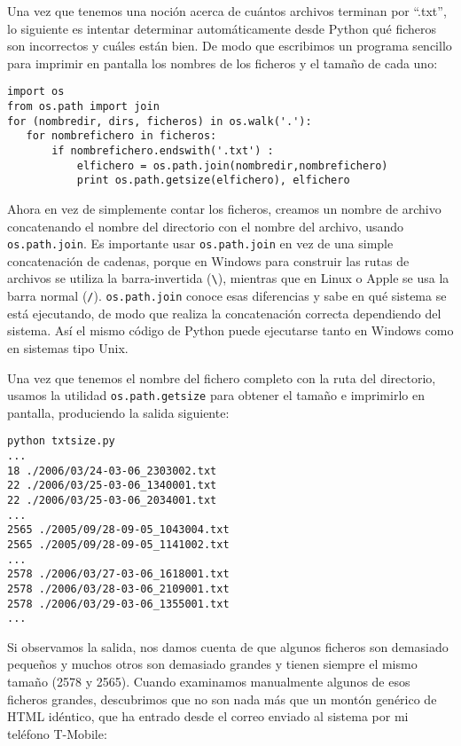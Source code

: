 Una vez que tenemos una noción acerca de cuántos archivos terminan por ``.txt'', lo
siguiente es intentar determinar automáticamente
desde Python qué ficheros son incorrectos y cuáles están bien.
De modo que escribimos un programa sencillo para imprimir en pantalla los
nombres de los ficheros y el tamaño de cada uno:

\beforeverb
\begin{verbatim}
import os
from os.path import join
for (nombredir, dirs, ficheros) in os.walk('.'):
   for nombrefichero in ficheros:
       if nombrefichero.endswith('.txt') :
           elfichero = os.path.join(nombredir,nombrefichero)
           print os.path.getsize(elfichero), elfichero
\end{verbatim}
\afterverb
%
Ahora en vez de simplemente contar los ficheros, creamos
un nombre de archivo concatenando el nombre del directorio con
el nombre del archivo, usando {\tt os.path.join}.
Es importante usar
{\tt os.path.join} en vez de una simple concatenación de cadenas,
porque en Windows para construir las rutas de archivos
se utiliza la barra-invertida (\verb"\"), mientras que en Linux
o Apple se usa la barra normal (\verb"/").
{\tt os.path.join} conoce esas diferencias y sabe en qué
sistema se está ejecutando, de modo que realiza la concatenación correcta
dependiendo del sistema. Así el mismo código de Python
puede ejecutarse tanto en Windows como en sistemas tipo Unix.

Una vez que tenemos el nombre del fichero completo con la ruta
del directorio, usamos la utilidad {\tt os.path.getsize}
para obtener el tamaño e imprimirlo en pantalla, produciendo la
salida siguiente:

\beforeverb
\begin{verbatim}
python txtsize.py
...
18 ./2006/03/24-03-06_2303002.txt
22 ./2006/03/25-03-06_1340001.txt
22 ./2006/03/25-03-06_2034001.txt
...
2565 ./2005/09/28-09-05_1043004.txt
2565 ./2005/09/28-09-05_1141002.txt
...
2578 ./2006/03/27-03-06_1618001.txt
2578 ./2006/03/28-03-06_2109001.txt
2578 ./2006/03/29-03-06_1355001.txt
...
\end{verbatim}
\afterverb
%
Si observamos la salida, nos damos cuenta de que algunos ficheros son demasiado pequeños y
muchos otros son demasiado grandes y tienen siempre el mismo tamaño (2578 y 2565).
Cuando examinamos manualmente algunos de esos ficheros grandes,
descubrimos que no son nada más que un montón genérico de HTML idéntico, que ha entrado
desde el correo enviado al sistema por mi teléfono T-Mobile:

